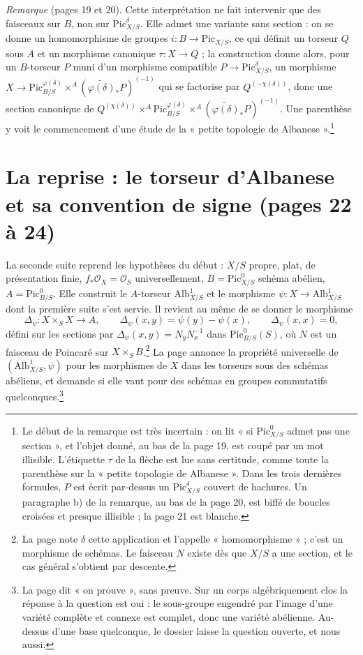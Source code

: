 \documentclass[11pt,a4paper]{article}
\begin{document}
\emph{Remarque} (pages 19 et 20). Cette interprétation ne fait intervenir que
des faisceaux sur $B$, non sur $\mathrm{Pic}^{\delta}_{X/S}$. Elle admet une
variante sans section : on se donne un homomorphisme de groupes
$i : B \to \mathrm{Pic}_{X/S}$, ce qui définit un torseur $Q$ sous $A$ et un
morphisme canonique $\tau : X \to Q$ ; la construction donne alors, pour un
$B$-torseur $P$ muni d'un morphisme compatible
$P \to \mathrm{Pic}^{\delta}_{X/S}$, un morphisme $X \to
\mathrm{Pic}^{\varphi(\delta)}_{B/S} \times^{A}
(\widetilde{\varphi(\delta)}_{*}P)^{(-1)}$ qui se factorise par
$Q^{(-\chi(\delta))}$, donc une section canonique de
$Q^{(\chi(\delta))} \times^{A} \mathrm{Pic}^{\varphi(\delta)}_{B/S}
\times^{A} (\widetilde{\varphi(\delta)}_{*}P)^{(-1)}$. Une parenthèse y voit le
commencement d'une étude de la « petite topologie de Albanese ».\footnote{Le
début de la remarque est très incertain : on lit « si
$\mathrm{Pic}^{0}_{X/S}$ admet pas une section », et l'objet donné, au bas de
la page 19, est coupé par un mot illisible. L'étiquette $\tau$ de la flèche
est lue sans certitude, comme toute la parenthèse sur la « petite topologie
de Albanese ». Dans les trois dernières formules, $P$ est écrit par-dessus un
$\mathrm{Pic}^{\delta}_{X/S}$ couvert de hachures. Un paragraphe b) de la
remarque, au bas de la page 20, est biffé de boucles croisées et presque
illisible ; la page 21 est blanche.}

\section*{La reprise : le torseur d'Albanese et sa convention de signe (pages 22 à 24)}

La seconde suite reprend les hypothèses du début : $X/S$ propre, plat, de
présentation finie, $f_{*}\mathcal{O}_X = \mathcal{O}_S$ universellement,
$B = \mathrm{Pic}^{0}_{X/S}$ schéma abélien, $A = \mathrm{Pic}^{0}_{B/S}$. Elle
construit le $A$-torseur $\mathrm{Alb}^{1}_{X/S}$ et le morphisme
$\psi : X \to \mathrm{Alb}^{1}_{X/S}$ dont la première suite s'est servie.
Il revient au même de se donner le morphisme
\[
\Delta_{\psi} : X \times_S X \longrightarrow A,
\qquad \Delta_{\psi}(x, y) = \psi(y) - \psi(x),
\qquad \Delta_{\psi}(x, x) = 0,
\]
défini sur les sections par $\Delta_{\psi}(x, y) = N_y N_x^{-1}$ dans
$\mathrm{Pic}^{0}_{B/S}(S)$, où $N$ est un faisceau de Poincaré sur
$X \times_S B$.\footnote{La page note $\delta$ cette application et l'appelle
« homomorphisme » ; c'est un morphisme de schémas. Le faisceau $N$ existe dès
que $X/S$ a une section, et le cas général s'obtient par descente.} La page
annonce la propriété universelle de $(\mathrm{Alb}^{1}_{X/S}, \psi)$ pour les
morphismes de $X$ dans les torseurs sous des schémas abéliens, et demande si
elle vaut pour des schémas en groupes commutatifs quelconques.\footnote{La page
dit « on prouve », sans preuve. Sur un corps algébriquement clos la réponse à
la question est oui : le sous-groupe engendré par l'image d'une variété
complète et connexe est complet, donc une variété abélienne. Au-dessus d'une
base quelconque, le dossier laisse la question ouverte, et nous aussi.}
\end{document}
